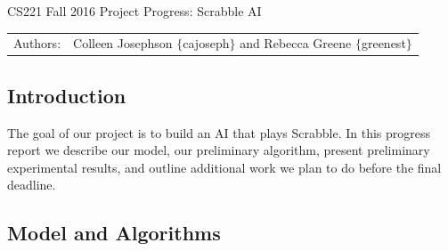 \documentclass[12pt]{article}
\begin{document}
\begin{center}
{\Large CS221 Fall 2016 Project Progress: Scrabble AI}

\begin{tabular}{rl}
  Authors: & Colleen Josephson $\{$cajoseph$\}$ and Rebecca Greene $\{$greenest$\}$\\
\end{tabular}
\end{center}

\subsection*{Introduction}
The goal of our project is to build an AI that plays Scrabble.  In this progress report we describe our model,
our preliminary algorithm, present preliminary experimental results,
and outline additional work we plan to do before the final
deadline. 

\subsection*{Model and Algorithms}
\end{document}
